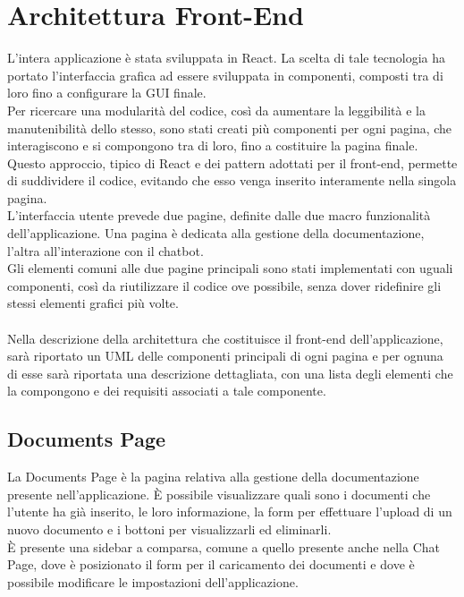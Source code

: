 \section{Architettura Front-End} \label{sec:archfront}
L'intera applicazione è stata sviluppata in React. La scelta di tale tecnologia ha portato l'interfaccia grafica ad essere sviluppata in componenti, composti tra di loro fino a configurare la GUI finale.\\
Per ricercare una modularità del codice, così da aumentare la leggibilità e la manutenibilità dello stesso, sono stati creati più componenti per ogni pagina, che interagiscono e si compongono tra di loro, fino a costituire la pagina finale. Questo approccio, tipico di React e dei pattern adottati per il front-end, permette di suddividere il codice, evitando che esso venga inserito interamente nella singola pagina.\\
L'interfaccia utente prevede due pagine, definite dalle due macro funzionalità dell'applicazione. Una pagina è dedicata alla gestione della documentazione, l'altra all'interazione con il chatbot.\\
Gli elementi comuni alle due pagine principali sono stati implementati con uguali componenti, così da riutilizzare il codice ove possibile, senza dover ridefinire gli stessi elementi grafici più volte.\\ \\
Nella descrizione della architettura che costituisce il front-end dell'applicazione, sarà riportato un UML delle componenti principali di ogni pagina e per ognuna di esse sarà riportata una descrizione dettagliata, con una lista degli elementi che la compongono e dei requisiti associati a tale componente.

\newpage

\subsection{Documents Page}

La Documents Page è la pagina relativa alla gestione della documentazione presente nell'applicazione. È possibile visualizzare quali sono i documenti che l'utente ha già inserito, le loro informazione, la form per effettuare l'upload di un nuovo documento e i bottoni per visualizzarli ed eliminarli.\\
È presente una sidebar a comparsa, comune a quello presente anche nella Chat Page, dove è posizionato il form per il caricamento dei documenti e dove è possibile modificare le impostazioni dell'applicazione.

